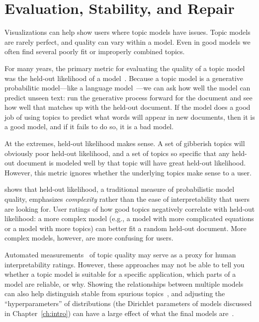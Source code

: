 \section{Evaluation, Stability, and Repair}
\label{sec:coherence}

Visualizations can help show users where topic models have issues.
Topic models are rarely perfect, and quality can vary within a
model. Even in good models we often find several poorly fit or
improperly combined topics. 

For many years, the primary metric for evaluating the quality of a
topic model was the held-out likelihood of a model~\citep{wallach-09a}.
Because a topic model is a generative probabilitic model---like a
language model~\citep{chen-98}---we can ask how well the model can
predict unseen text: run the generative process forward for the
document and see how well that matches up with the held-out document.
If the model does a good job of using topics to predict what words
will appear in new documents, then it is a good model, and if it fails
to do so, it is a bad model.

At the extremes, held-out likelihood makes sense.  
A set of gibberish topics will obviously poor held-out likelihood, and
a set of topics so specific that any held-out document is modeled well
by that topic will have great held-out likelihood.
However, this metric ignores whether the underlying topics make sense
to a user.

\citet{chang-09b} shows that
held-out likelihood, a traditional measure of probabilistic model quality,
emphasizes \emph{complexity} rather than the ease of interpretability
that users are looking for.  
User ratings of how good topics negatively correlate with
held-out likelihood: a more complex model (e.g., a model with more
complicated equations or a model with more topics) can better fit a random
held-out document. 
More complex models, however, are more confusing for users. 

Automated measurements~\citep{newman-10,mimno-11,lau-14} of topic
quality may serve as a proxy for human interpretability ratings.
However, these approaches may not be able to tell you
whether a topic model is suitable for a specific application, which parts of a model are reliable, or why.
Showing the relationships between multiple models can also help
distinguish stable from spurious topics~\citep{chuang-15}, and
adjusting the ``hyperparameters'' of distributions (the Dirichlet
parameters of models discussed in Chapter~\ref{ch:intro}) can have a
large effect of what the final models are~\citep{wallach-09b}.

